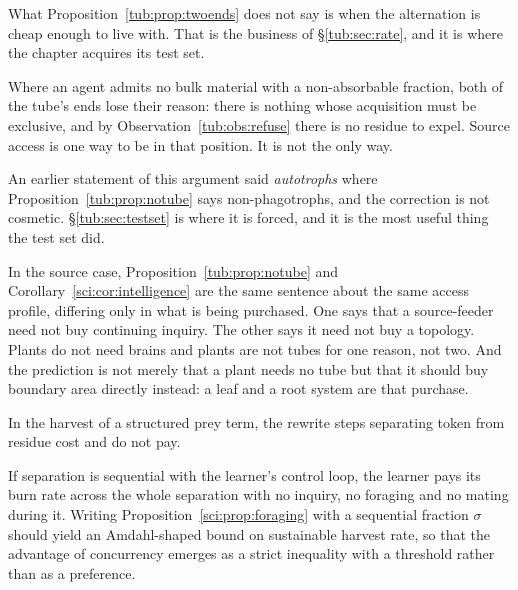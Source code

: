 What Proposition~\ref{tub:prop:twoends} does not say is when the alternation is
cheap enough to live with. That is the business of \S\ref{tub:sec:rate}, and it
is where the chapter acquires its test set.

\begin{proposition}
\label{tub:prop:notube}
Where an agent admits no bulk material with a non-absorbable fraction, both of
the tube's ends lose their reason: there is nothing whose acquisition must be
exclusive, and by Observation~\ref{tub:obs:refuse} there is no residue to expel.
Source access is one way to be in that position. It is not the only way.
\end{proposition}

An earlier statement of this argument said \emph{autotrophs} where
Proposition~\ref{tub:prop:notube} says non-phagotrophs, and the correction is not
cosmetic. \S\ref{tub:sec:testset} is where it is forced, and it is the most
useful thing the test set did.

In the source case, Proposition~\ref{tub:prop:notube} and
Corollary~\ref{sci:cor:intelligence} are the same sentence about the same access
profile, differing only in what is being purchased. One says that a
source-feeder need not buy continuing inquiry. The other says it need not buy a
topology. Plants do not need brains and plants are not tubes for one reason, not
two. And the prediction is not merely that a plant needs no tube but that it
should buy boundary area directly instead: a leaf and a root system are that
purchase.

\begin{conjecture}
\label{tub:conj:sep}
In the harvest of a structured prey term, the rewrite steps separating token
from residue cost and do not pay.
\end{conjecture}

\begin{conjecture}
\label{tub:conj:serial}
If separation is sequential with the learner's control loop, the learner pays
its burn rate across the whole separation with no inquiry, no foraging and no
mating during it. Writing Proposition~\ref{sci:prop:foraging} with a sequential
fraction $\sigma$ should yield an Amdahl-shaped bound \cite{amdahl1967} on
sustainable harvest rate, so that the advantage of concurrency emerges as a
strict inequality with a threshold rather than as a preference.
\end{conjecture}

